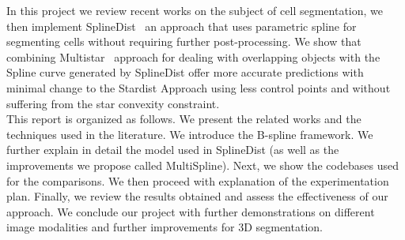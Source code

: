 \documentclass[main.tex]{subfiles}
\begin{document}
In this project we review recent works on the subject of cell segmentation, we then implement SplineDist~\cite{Mandal2020} an approach that uses parametric spline for segmenting cells without requiring further post-processing. We show that combining Multistar~\cite{Walter2020} approach for dealing with overlapping objects with the Spline curve generated by SplineDist offer more accurate predictions with minimal change to the Stardist Approach using less control points and without suffering from the star convexity constraint.\\

This report is organized as follows. We present the related works and the techniques used in the literature. We introduce the B-spline framework. We further explain in detail the model used in SplineDist (as well as the improvements we propose called MultiSpline). Next, we show the codebases used for the comparisons. We then proceed with explanation of the experimentation plan. Finally, we review the results obtained and assess the effectiveness of our approach. We conclude our project with further demonstrations on different image modalities and further improvements for 3D segmentation.\\


\end{document}
